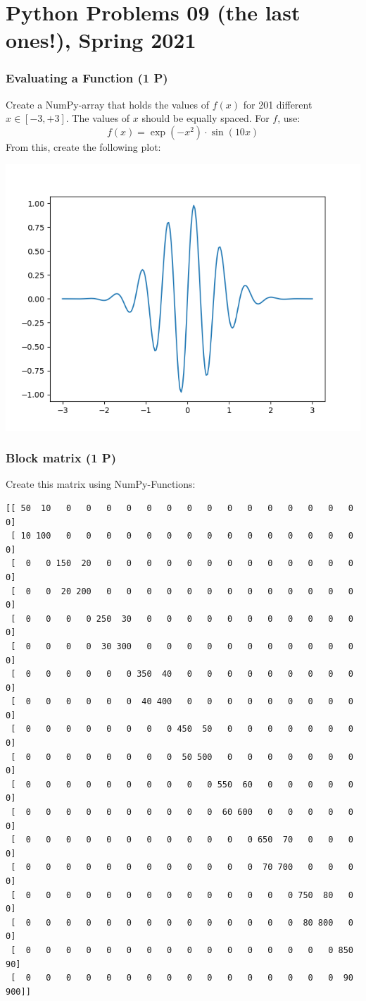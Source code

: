 \documentclass[
	english,
	fontsize=10pt,
	parskip=half,
	titlepage=true,
	DIV=12
]{scrartcl}
\begin{document}
\part*{Python Problems 09 (the last ones!), Spring 2021}

\section{Evaluating a Function (1 P)}
Create a NumPy-array that holds the values of $f(x)$ for 201 different $x \in [-3, +3]$. The values of $x$ should be equally spaced. For $f$, use:
\[ f(x) = \exp(-x^2) \cdot \sin(10x) \]
From this, create the following plot:
\begin{center}
	\includegraphics[width=.5\linewidth]{./task1}
\end{center}

\section{Block matrix (1 P)}
Create this matrix using NumPy-Functions:
\begin{verbatim}
[[ 50  10   0   0   0   0   0   0   0   0   0   0   0   0   0   0   0   0]
 [ 10 100   0   0   0   0   0   0   0   0   0   0   0   0   0   0   0   0]
 [  0   0 150  20   0   0   0   0   0   0   0   0   0   0   0   0   0   0]
 [  0   0  20 200   0   0   0   0   0   0   0   0   0   0   0   0   0   0]
 [  0   0   0   0 250  30   0   0   0   0   0   0   0   0   0   0   0   0]
 [  0   0   0   0  30 300   0   0   0   0   0   0   0   0   0   0   0   0]
 [  0   0   0   0   0   0 350  40   0   0   0   0   0   0   0   0   0   0]
 [  0   0   0   0   0   0  40 400   0   0   0   0   0   0   0   0   0   0]
 [  0   0   0   0   0   0   0   0 450  50   0   0   0   0   0   0   0   0]
 [  0   0   0   0   0   0   0   0  50 500   0   0   0   0   0   0   0   0]
 [  0   0   0   0   0   0   0   0   0   0 550  60   0   0   0   0   0   0]
 [  0   0   0   0   0   0   0   0   0   0  60 600   0   0   0   0   0   0]
 [  0   0   0   0   0   0   0   0   0   0   0   0 650  70   0   0   0   0]
 [  0   0   0   0   0   0   0   0   0   0   0   0  70 700   0   0   0   0]
 [  0   0   0   0   0   0   0   0   0   0   0   0   0   0 750  80   0   0]
 [  0   0   0   0   0   0   0   0   0   0   0   0   0   0  80 800   0   0]
 [  0   0   0   0   0   0   0   0   0   0   0   0   0   0   0   0 850  90]
 [  0   0   0   0   0   0   0   0   0   0   0   0   0   0   0   0  90 900]]
\end{verbatim}
\end{document}
